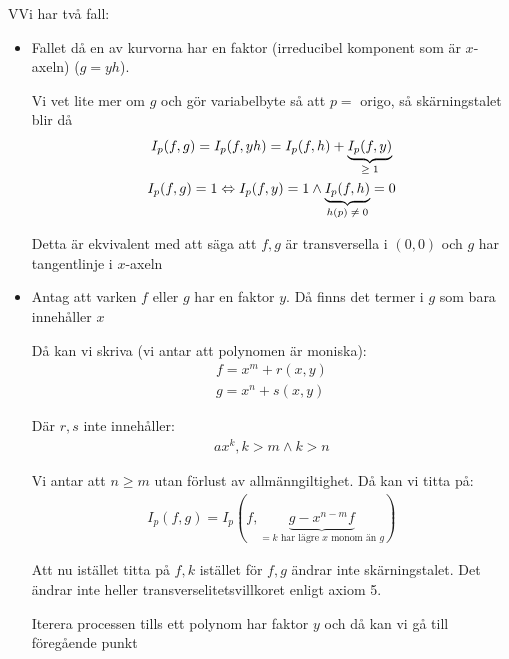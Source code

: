 \begin{prf}
  VVi har två fall:
  \begin{itemize}
    \item Fallet då en av kurvorna har en faktor (irreducibel komponent som är $x$-axeln) ($g=yh$).
      \par\bigskip
      \noindent Vi vet lite mer om $g$ och gör variabelbyte så att $p=$ origo, så skärningstalet blir då
      \begin{equation*}
        \begin{gathered}
          I_p(f,g) = I_p(f,yh) = I_p(f,h)+\underbrace{I_p(f,y)}_{\text{$\geq1$}}\\
          I_p(f,g) = 1\Leftrightarrow I_p(f,y) = 1 \wedge \underbrace{I_p(f,h)}_{\text{$h(p)\neq0$}} = 0
        \end{gathered}
      \end{equation*}
      \par\bigskip
      \noindent Detta är ekvivalent med att säga att $f,g$ är transversella i $(0,0)$ och $g$ har tangentlinje i $x$-axeln
      \par\bigskip
    \item Antag att varken $f$ eller $g$ har en faktor $y$. Då finns det termer i $g$ som bara innehåller $x$\par
      \noindent Då kan vi skriva (vi antar att polynomen är moniska):
      \begin{equation*}
        \begin{gathered}
          f = x^m+r(x,y)\\
          g = x^n +s(x,y)
        \end{gathered}
      \end{equation*}\par
      \noindent Där $r,s$ inte innehåller:
      \begin{equation*}
        \begin{gathered}
          ax^k, k>m\wedge k>n
        \end{gathered}
      \end{equation*}\par
      \noindent Vi antar att $n\geq m$ utan förlust av allmänngiltighet. Då kan vi titta på:
      \begin{equation*}
        \begin{gathered}
          I_p(f,g) = I_p(f,\underbrace{g-x^{n-m}f}_{\text{$=k$ har lägre $x$ monom än $g$}})
        \end{gathered}
      \end{equation*}
      \par\bigskip
      \noindent Att nu istället titta på $f,k$ istället för $f,g$ ändrar inte skärningstalet. Det ändrar inte heller transverselitetsvillkoret enligt axiom 5.\par
      \noindent Iterera processen tills ett polynom har faktor $y$ och då kan vi gå till föregående punkt 
  \end{itemize}
\end{prf}
